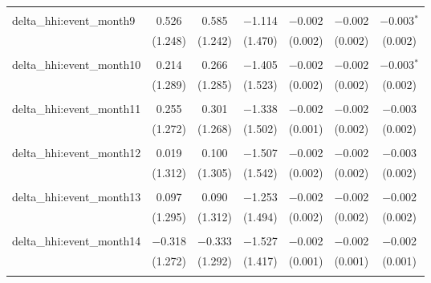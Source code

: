\begin{table}[H]
{\begin{tabular}{@{\extracolsep{5pt}}lcccccc}
   & & & & & & \\  

  delta\_hhi:event\_month9 & 0.526 & 0.585 & $-$1.114 & $-$0.002 & $-$0.002 & $-$0.003$^{*}$ \\  

   & (1.248) & (1.242) & (1.470) & (0.002) & (0.002) & (0.002) \\  

   & & & & & & \\  

  delta\_hhi:event\_month10 & 0.214 & 0.266 & $-$1.405 & $-$0.002 & $-$0.002 & $-$0.003$^{*}$ \\  

   & (1.289) & (1.285) & (1.523) & (0.002) & (0.002) & (0.002) \\  

   & & & & & & \\  

  delta\_hhi:event\_month11 & 0.255 & 0.301 & $-$1.338 & $-$0.002 & $-$0.002 & $-$0.003 \\  

   & (1.272) & (1.268) & (1.502) & (0.001) & (0.002) & (0.002) \\  

   & & & & & & \\  

  delta\_hhi:event\_month12 & 0.019 & 0.100 & $-$1.507 & $-$0.002 & $-$0.002 & $-$0.003 \\  

   & (1.312) & (1.305) & (1.542) & (0.002) & (0.002) & (0.002) \\  

   & & & & & & \\  

  delta\_hhi:event\_month13 & 0.097 & 0.090 & $-$1.253 & $-$0.002 & $-$0.002 & $-$0.002 \\  

   & (1.295) & (1.312) & (1.494) & (0.002) & (0.002) & (0.002) \\  

   & & & & & & \\  

  delta\_hhi:event\_month14 & $-$0.318 & $-$0.333 & $-$1.527 & $-$0.002 & $-$0.002 & $-$0.002 \\  

   & (1.272) & (1.292) & (1.417) & (0.001) & (0.001) & (0.001) \\  

   & & & & & & \\  


\end{tabular}}
\end{table}

